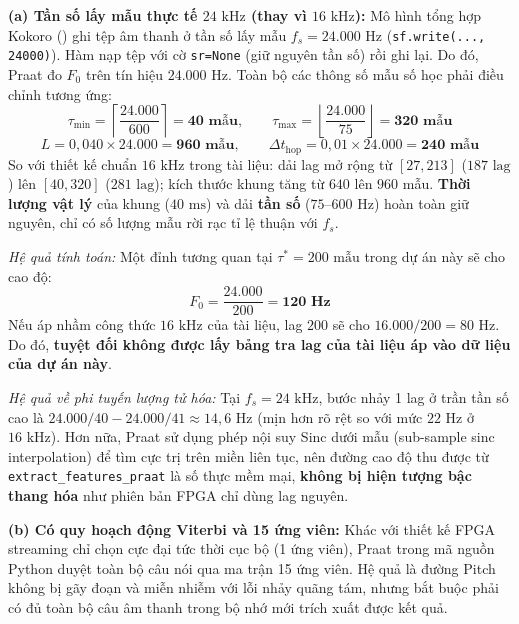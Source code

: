 \documentclass[11pt,a4paper]{article}
\begin{document}
\textbf{(a) Tần số lấy mẫu thực tế $24\text{ kHz}$ (thay vì $16\text{ kHz}$):}
Mô hình tổng hợp Kokoro () ghi tệp âm thanh ở tần số lấy mẫu $f_s = 24.000\text{ Hz}$ (\texttt{sf.write(..., 24000)}). Hàm  nạp tệp với cờ \texttt{sr=None} (giữ nguyên tần số) rồi ghi lại. Do đó, Praat đo $F_0$ trên tín hiệu $24.000\text{ Hz}$. Toàn bộ các thông số mẫu số học phải điều chỉnh tương ứng:
\begin{equation}
\tau_{\min} = \left\lceil \frac{24.000}{600} \right\rceil = \mathbf{40\text{ mẫu}}, \qquad \tau_{\max} = \left\lfloor \frac{24.000}{75} \right\rfloor = \mathbf{320\text{ mẫu}}
\end{equation}
\begin{equation}
L = 0{,}040 \times 24.000 = \mathbf{960\text{ mẫu}}, \qquad \Delta t_{\text{hop}} = 0{,}01 \times 24.000 = \mathbf{240\text{ mẫu}}
\end{equation}
So với thiết kế chuẩn $16\text{ kHz}$ trong tài liệu: dải lag mở rộng từ $[27, 213]$ ($187\text{ lag}$) lên $[40, 320]$ ($281\text{ lag}$); kích thước khung tăng từ $640$ lên $960$ mẫu. \textbf{Thời lượng vật lý} của khung ($40\text{ ms}$) và dải \textbf{tần số} ($75\text{--}600\text{ Hz}$) hoàn toàn giữ nguyên, chỉ có số lượng mẫu rời rạc tỉ lệ thuận với $f_s$.

\textit{Hệ quả tính toán:} Một đỉnh tương quan tại $\tau^* = 200\text{ mẫu}$ trong dự án này sẽ cho cao độ:
\[
F_0 = \frac{24.000}{200} = \mathbf{120\text{ Hz}}
\]
Nếu áp nhầm công thức $16\text{ kHz}$ của tài liệu, lag $200$ sẽ cho $16.000 / 200 = 80\text{ Hz}$. Do đó, \textbf{tuyệt đối không được lấy bảng tra lag của tài liệu áp vào dữ liệu của dự án này}.

\textit{Hệ quả về phi tuyến lượng tử hóa:} Tại $f_s = 24\text{ kHz}$, bước nhảy 1 lag ở trần tần số cao là $24.000/40 - 24.000/41 \approx 14{,}6\text{ Hz}$ (mịn hơn rõ rệt so với mức $22\text{ Hz}$ ở $16\text{ kHz}$). Hơn nữa, Praat sử dụng phép nội suy Sinc dưới mẫu (sub-sample sinc interpolation) để tìm cực trị trên miền liên tục, nên đường cao độ thu được từ \texttt{extract\_features\_praat} là số thực mềm mại, \textbf{không bị hiện tượng bậc thang hóa} như phiên bản FPGA chỉ dùng lag nguyên.

\textbf{(b) Có quy hoạch động Viterbi và 15 ứng viên:}
Khác với thiết kế FPGA streaming chỉ chọn cực đại tức thời cục bộ (1 ứng viên), Praat trong mã nguồn Python duyệt toàn bộ câu nói qua ma trận 15 ứng viên. Hệ quả là đường Pitch không bị gãy đoạn và miễn nhiễm với lỗi nhảy quãng tám, nhưng bắt buộc phải có đủ toàn bộ câu âm thanh trong bộ nhớ mới trích xuất được kết quả.
\end{document}
